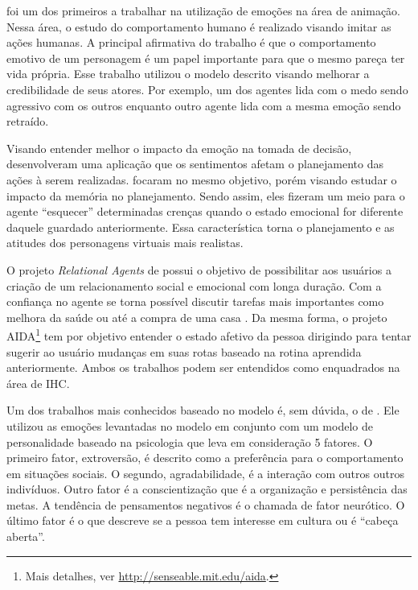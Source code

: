 \citet{bates1994role} foi um dos primeiros a trabalhar na utilização de emoções
na área de animação. Nessa área, o estudo do comportamento humano é
realizado visando imitar as ações humanas. A principal afirmativa do trabalho
é que o comportamento emotivo de um personagem é um papel importante para que
o mesmo pareça ter vida própria. Esse trabalho utilizou o modelo descrito
visando melhorar a credibilidade de seus atores. Por exemplo, um dos agentes
lida com o medo sendo agressivo com os outros enquanto outro agente lida com a
mesma emoção sendo retraído.

Visando entender melhor o impacto da emoção na tomada de decisão,
\citet{zhang2009emotional} desenvolveram uma aplicação que os sentimentos
afetam o planejamento das ações à serem realizadas.
\citet{neto2010construction} focaram no mesmo objetivo, porém visando estudar
o impacto da memória no planejamento. Sendo assim, eles fizeram um meio
para o agente ``esquecer'' determinadas crenças quando o estado emocional
for diferente daquele guardado anteriormente. Essa característica torna o
planejamento e as atitudes dos personagens virtuais mais realistas.

O projeto \emph{Relational Agents} de \citet{bick2003relational} possui o
objetivo de possibilitar aos usuários a criação de um relacionamento social e
emocional com longa duração. Com a confiança no agente se torna possível
discutir tarefas mais importantes como melhora da saúde ou até a compra de uma
casa \cite{bickmore2009virtual}. Da mesma forma, o projeto AIDA\footnote{Mais
detalhes, ver \url{http://senseable.mit.edu/aida}.} tem por objetivo entender
o estado afetivo da pessoa dirigindo para tentar sugerir ao usuário mudanças
em suas rotas baseado na rotina aprendida anteriormente. Ambos os trabalhos
podem ser entendidos como enquadrados na área de IHC.

Um dos trabalhos mais conhecidos baseado no modelo \occ é, sem dúvida, o de
\citet{kshirsagar2002multilayer}. Ele utilizou
as emoções levantadas no modelo em conjunto com um modelo de personalidade
baseado na psicologia que leva em consideração 5 fatores. O primeiro fator,
extroversão, é descrito como a preferência para o comportamento em situações
sociais. O segundo, agradabilidade, é a interação com outros outros
indivíduos. Outro fator é a conscientização que é a organização e persistência
das metas. A tendência de pensamentos negativos é o chamada de fator
neurótico. O último fator é o que descreve se a pessoa tem interesse em
cultura ou é ``cabeça aberta''.

